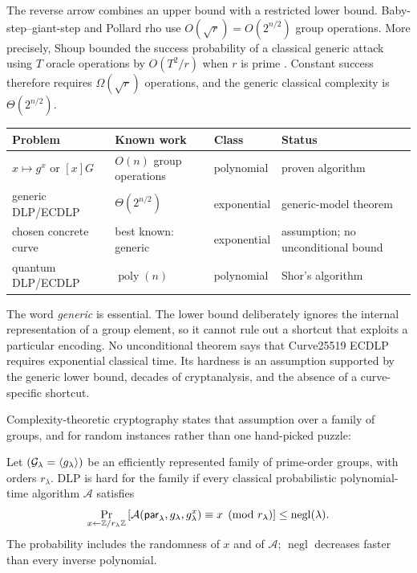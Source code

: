 The reverse arrow combines an upper bound with a restricted lower bound.
Baby-step--giant-step and Pollard rho use $O(\sqrt r)=O(2^{n/2})$ group
operations. More precisely, Shoup bounded the success probability of a
classical generic attack using $T$ oracle operations by $O(T^2/r)$ when $r$ is
prime \cite{shoup1997lower}. Constant success therefore requires
$\Omega(\sqrt r)$ operations, and the generic classical complexity is
$\Theta(2^{n/2})$.

\begin{center}
\begin{tabularx}{\textwidth}{lllX}
\toprule
Problem & Known work & Class & Status \\
\midrule
$x\mapsto g^x$ or $[x]G$ & $O(n)$ group operations & polynomial & proven algorithm \\
generic DLP/ECDLP & $\Theta(2^{n/2})$ & exponential & generic-model theorem \\
chosen concrete curve & best known: generic & exponential & assumption; no unconditional bound \\
quantum DLP/ECDLP & $\operatorname{poly}(n)$ & polynomial & Shor's algorithm \\
\bottomrule
\end{tabularx}
\end{center}

The word \emph{generic} is essential. The lower bound deliberately ignores the
internal representation of a group element, so it cannot rule out a shortcut
that exploits a particular encoding. No unconditional theorem says that
Curve25519 ECDLP requires exponential classical time. Its hardness is an
assumption supported by the generic lower bound, decades of cryptanalysis, and
the absence of a curve-specific shortcut.

Complexity-theoretic cryptography states that assumption over a family of
groups, and for random instances rather than one hand-picked puzzle:

\begin{definition}
Let $(\mathcal{G}_\lambda=\langle g_\lambda\rangle)$ be an efficiently represented
family of prime-order groups, with orders $r_\lambda$. DLP is hard for the
family if every classical probabilistic polynomial-time algorithm $\mathcal A$
satisfies
\[
  \Pr_{x\leftarrow\mathbb{Z}/r_\lambda\mathbb{Z}}
  \left[
    \mathcal A(\mathsf{par}_\lambda,g_\lambda,g_\lambda^x)
      \equiv x\pmod{r_\lambda}
  \right]
  \le \operatorname{negl}(\lambda).
\]
The probability includes the randomness of $x$ and of $\mathcal A$;
$\operatorname{negl}$ decreases faster than every inverse polynomial.
\end{definition}

